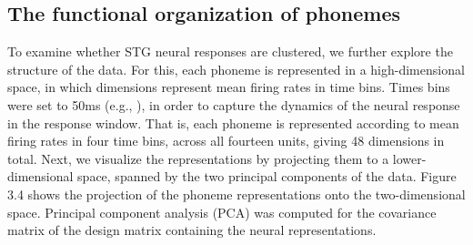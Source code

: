\subsection{The functional organization of phonemes}
To examine whether STG neural responses are clustered, we further explore the structure of the data. For this, each phoneme is represented in a high-dimensional space, in which dimensions represent mean firing rates in time bins. Times bins were set to 50ms (e.g., \citealp{chan2013speech, Mesgarani2014}), in order to capture the dynamics of the neural response in the response window. That is, each phoneme is represented according to mean firing rates in four time bins, across all fourteen units, giving 48 dimensions in total. Next, we visualize the representations by projecting them to a lower-dimensional space, spanned by the two principal components of the data. Figure 3.4 shows the projection of the phoneme representations onto the two-dimensional space. Principal component analysis (PCA) was computed for the covariance matrix of the design matrix containing the neural representations.

